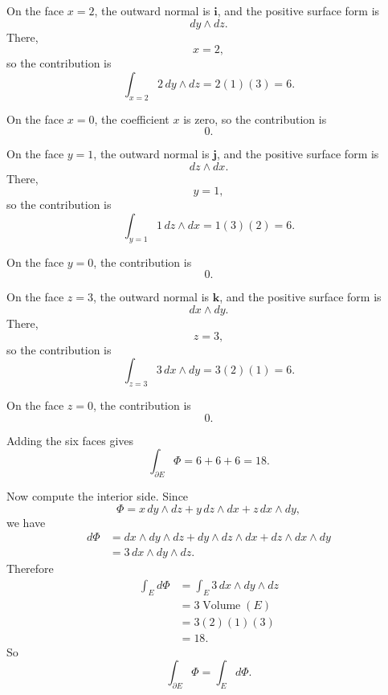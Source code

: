 On the face \(x=2\), the outward normal is \(\mathbf i\), and the positive surface form is
\[
    dy\wedge dz.
\]
There,
\[
    x=2,
\]
so the contribution is
\[
    \int_{x=2}2\,dy\wedge dz=2(1)(3)=6.
\]

On the face \(x=0\), the coefficient \(x\) is zero, so the contribution is
\[
    0.
\]

On the face \(y=1\), the outward normal is \(\mathbf j\), and the positive surface form is
\[
    dz\wedge dx.
\]
There,
\[
    y=1,
\]
so the contribution is
\[
    \int_{y=1}1\,dz\wedge dx=1(3)(2)=6.
\]

On the face \(y=0\), the contribution is
\[
    0.
\]

On the face \(z=3\), the outward normal is \(\mathbf k\), and the positive surface form is
\[
    dx\wedge dy.
\]
There,
\[
    z=3,
\]
so the contribution is
\[
    \int_{z=3}3\,dx\wedge dy=3(2)(1)=6.
\]

On the face \(z=0\), the contribution is
\[
    0.
\]

Adding the six faces gives
\[
\boxed{
    \int_{\partial E}\Phi=6+6+6=18.
}
\]

Now compute the interior side.  Since
\[
    \Phi=x\,dy\wedge dz+y\,dz\wedge dx+z\,dx\wedge dy,
\]
we have
\[
\begin{aligned}
    d\Phi
    &=
    dx\wedge dy\wedge dz
    +
    dy\wedge dz\wedge dx
    +
    dz\wedge dx\wedge dy\\
    &=
    3\,dx\wedge dy\wedge dz.
\end{aligned}
\]
Therefore
\[
\begin{aligned}
    \int_E d\Phi
    &=
    \int_E 3\,dx\wedge dy\wedge dz\\
    &=
    3\operatorname{Volume}(E)\\
    &=
    3(2)(1)(3)\\
    &=
    18.
\end{aligned}
\]
So
\[
\boxed{
    \int_{\partial E}\Phi=\int_E d\Phi.
}
\]

